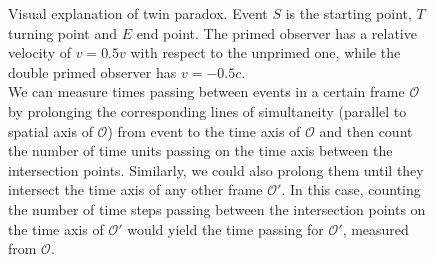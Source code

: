 \begin{figure}
	\centering


	\caption{Visual explanation of twin paradox. Event $S$ is the starting point, $T$ turning point and $E$ end point. The primed observer has a relative velocity of $v = 0.5 v$ with respect to the unprimed one, while the double primed observer has $v = -0.5 c$.\\
	We can measure times passing between events in a certain frame $\mathcal{O}$ by prolonging the corresponding lines of simultaneity (parallel to spatial axis of $\mathcal{O}$) from event to the time axis of $\mathcal{O}$ and then count the number of time units passing on the time axis between the intersection points. Similarly, we could also prolong them until they intersect the time axis of any other frame $\mathcal{O}'$. In this case, counting the number of time steps passing between the intersection points on the time axis of $\mathcal{O}'$ would yield the time passing for $\mathcal{O}'$, measured from $\mathcal{O}$.}
	\label{fig:twin_paradox}
\end{figure}


